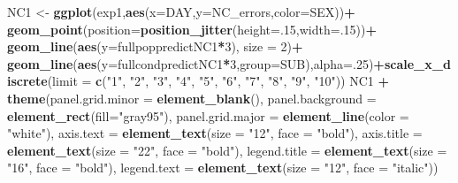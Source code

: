 \documentclass[]{article}
\newenvironment{Shaded}{\begin{snugshade}}{\end{snugshade}}
\newcommand{\KeywordTok}[1]{\textcolor[rgb]{0.13,0.29,0.53}{\textbf{#1}}}
\newcommand{\DataTypeTok}[1]{\textcolor[rgb]{0.13,0.29,0.53}{#1}}
\newcommand{\DecValTok}[1]{\textcolor[rgb]{0.00,0.00,0.81}{#1}}
\newcommand{\StringTok}[1]{\textcolor[rgb]{0.31,0.60,0.02}{#1}}
\newcommand{\OperatorTok}[1]{\textcolor[rgb]{0.81,0.36,0.00}{\textbf{#1}}}
\newcommand{\NormalTok}[1]{#1}
\begin{document}
\begin{Shaded}
\begin{Highlighting}[]
\NormalTok{NC1 <-}\StringTok{ }\KeywordTok{ggplot}\NormalTok{(exp1,}\KeywordTok{aes}\NormalTok{(}\DataTypeTok{x=}\NormalTok{DAY,}\DataTypeTok{y=}\NormalTok{NC_errors,}\DataTypeTok{color=}\NormalTok{SEX))}\OperatorTok{+}
\StringTok{  }\KeywordTok{geom_point}\NormalTok{(}\DataTypeTok{position=}\KeywordTok{position_jitter}\NormalTok{(}\DataTypeTok{height=}\NormalTok{.}\DecValTok{15}\NormalTok{,}\DataTypeTok{width=}\NormalTok{.}\DecValTok{15}\NormalTok{))}\OperatorTok{+}
\StringTok{  }\KeywordTok{geom_line}\NormalTok{(}\KeywordTok{aes}\NormalTok{(}\DataTypeTok{y=}\NormalTok{fullpoppredictNC1}\OperatorTok{*}\DecValTok{3}\NormalTok{), }\DataTypeTok{size =} \DecValTok{2}\NormalTok{)}\OperatorTok{+}
\StringTok{  }\KeywordTok{geom_line}\NormalTok{(}\KeywordTok{aes}\NormalTok{(}\DataTypeTok{y=}\NormalTok{fullcondpredictNC1}\OperatorTok{*}\DecValTok{3}\NormalTok{,}\DataTypeTok{group=}\NormalTok{SUB),}\DataTypeTok{alpha=}\NormalTok{.}\DecValTok{25}\NormalTok{)}\OperatorTok{+}\KeywordTok{scale_x_discrete}\NormalTok{(}\DataTypeTok{limit =} \KeywordTok{c}\NormalTok{(}\StringTok{"1"}\NormalTok{, }\StringTok{"2"}\NormalTok{, }\StringTok{"3"}\NormalTok{, }\StringTok{"4"}\NormalTok{, }\StringTok{"5"}\NormalTok{, }\StringTok{"6"}\NormalTok{, }\StringTok{"7"}\NormalTok{, }\StringTok{"8"}\NormalTok{, }\StringTok{"9"}\NormalTok{, }\StringTok{"10"}\NormalTok{))}
\NormalTok{NC1 }\OperatorTok{+}\StringTok{ }\KeywordTok{theme}\NormalTok{(}\DataTypeTok{panel.grid.minor =} \KeywordTok{element_blank}\NormalTok{(), }\DataTypeTok{panel.background =} \KeywordTok{element_rect}\NormalTok{(}\DataTypeTok{fill=}\StringTok{"gray95"}\NormalTok{), }\DataTypeTok{panel.grid.major =} \KeywordTok{element_line}\NormalTok{(}\DataTypeTok{color =} \StringTok{"white"}\NormalTok{), }\DataTypeTok{axis.text =} \KeywordTok{element_text}\NormalTok{(}\DataTypeTok{size =} \StringTok{"12"}\NormalTok{, }\DataTypeTok{face =} \StringTok{"bold"}\NormalTok{), }\DataTypeTok{axis.title =} \KeywordTok{element_text}\NormalTok{(}\DataTypeTok{size =} \StringTok{"22"}\NormalTok{, }\DataTypeTok{face =} \StringTok{"bold"}\NormalTok{), }\DataTypeTok{legend.title =} \KeywordTok{element_text}\NormalTok{(}\DataTypeTok{size =} \StringTok{"16"}\NormalTok{, }\DataTypeTok{face =} \StringTok{"bold"}\NormalTok{), }\DataTypeTok{legend.text =} \KeywordTok{element_text}\NormalTok{(}\DataTypeTok{size =} \StringTok{"12"}\NormalTok{, }\DataTypeTok{face =} \StringTok{"italic"}\NormalTok{))}
\end{Highlighting}
\end{Shaded}
\end{document}
